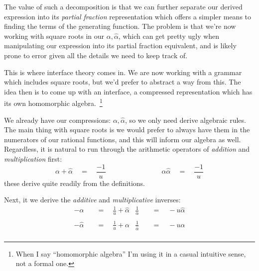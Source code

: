 \documentclass[twoside]{article}
\newcommand{\equals}{\ensuremath{\quad =\quad}}
\newcommand{\fourqquad}{\ensuremath{\qquad\qquad\qquad\qquad}}
\newcommand{\alphahat}{\ensuremath{\hat{\alpha}}}
\begin{document}
The value of such a decomposition is that we can further separate our derived expression into its \emph{partial fraction}
representation which offers a simpler means to finding the terms of the generating function. The problem is that we're now
working with square roots in our $ \alpha, \alphahat $, which can get pretty ugly when manipulating our expression into
its partial fraction equivalent, and is likely prone to error given all the details we need to keep track of.

This is where interface theory comes in. We are now working with a grammar which includes square roots, but we'd prefer
to abstract a way from this. The idea then is to come up with an interface, a compressed representation which has its own
homomorphic algebra.~\footnote{When I say ``homomorphic algebra'' I'm using it in a casual intuitive sense, not a formal one.}

We already have our compressions: $ \alpha, \alphahat $, so we only need derive algebraic rules. The main thing with square
roots is we would prefer to always have them in the numerators of our rational functions, and this will inform our algebra
as well. Regardless, it is natural to run through the arithmetic operators of \emph{addition} and \emph{multiplication} first:
$$ \alpha+\alphahat \equals \frac{-1}{u} \fourqquad \alpha\alphahat \equals \frac{-1}{u} $$
these derive quite readily from the definitions.

Next, it we derive the \emph{additive} and \emph{multiplicative} inverses:
\begin{align*}
-\alpha			& \equals \frac{1}{u}+\alphahat		& \frac{1}{\alpha}	& \equals -u\alphahat	\\
														\\
-\alphahat		& \equals \frac{1}{u}+\alpha		& \frac{1}{\alphahat}	& \equals -u\alpha	\\
\end{align*}
\end{document}

